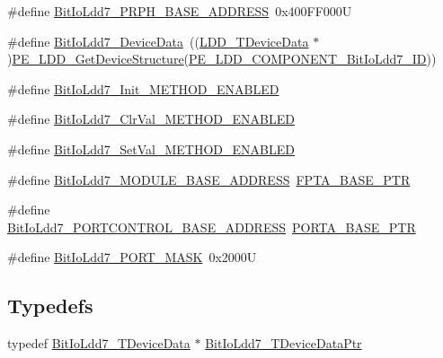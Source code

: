 \begin{DoxyCompactItemize}
\item 
\#define \hyperlink{group___bit_io_ldd7__module_gaecb0933dfdc4408d4e82af57b1458b41}{Bit\+Io\+Ldd7\+\_\+\+P\+R\+P\+H\+\_\+\+B\+A\+S\+E\+\_\+\+A\+D\+D\+R\+E\+SS}~0x400\+F\+F000U
\item 
\#define \hyperlink{group___bit_io_ldd7__module_ga28a1c938c911f765d2dc333694f9505f}{Bit\+Io\+Ldd7\+\_\+\+Device\+Data}~((\hyperlink{group___p_e___types__module_gac5cf1362f1f0e3a2ce71b1bf2276d091}{L\+D\+D\+\_\+\+T\+Device\+Data} $\ast$)\hyperlink{group___p_e___types__module_gaa1c23d559daef5bcd3327ca83fb56f5a}{P\+E\+\_\+\+L\+D\+D\+\_\+\+Get\+Device\+Structure}(\hyperlink{group___p_e___types__module_gaec9d06a6e78676f5d01ee4903a9960d3}{P\+E\+\_\+\+L\+D\+D\+\_\+\+C\+O\+M\+P\+O\+N\+E\+N\+T\+\_\+\+Bit\+Io\+Ldd7\+\_\+\+ID}))
\item 
\#define \hyperlink{group___bit_io_ldd7__module_ga0cd7de05139351a8d7223583734bc161}{Bit\+Io\+Ldd7\+\_\+\+Init\+\_\+\+M\+E\+T\+H\+O\+D\+\_\+\+E\+N\+A\+B\+L\+ED}
\item 
\#define \hyperlink{group___bit_io_ldd7__module_gaea56f115a6bef18bb9f57ff9d981ccbd}{Bit\+Io\+Ldd7\+\_\+\+Clr\+Val\+\_\+\+M\+E\+T\+H\+O\+D\+\_\+\+E\+N\+A\+B\+L\+ED}
\item 
\#define \hyperlink{group___bit_io_ldd7__module_gacb3f57b0defc7e929b43ddd858acfb15}{Bit\+Io\+Ldd7\+\_\+\+Set\+Val\+\_\+\+M\+E\+T\+H\+O\+D\+\_\+\+E\+N\+A\+B\+L\+ED}
\item 
\#define \hyperlink{group___bit_io_ldd7__module_gad8a699f629559c876160d573a75c2914}{Bit\+Io\+Ldd7\+\_\+\+M\+O\+D\+U\+L\+E\+\_\+\+B\+A\+S\+E\+\_\+\+A\+D\+D\+R\+E\+SS}~\hyperlink{group___backward___compatibility___symbols_ga4b0d89f517528ab7c1d2fdefe4c863d8}{F\+P\+T\+A\+\_\+\+B\+A\+S\+E\+\_\+\+P\+TR}
\item 
\#define \hyperlink{group___bit_io_ldd7__module_gac518d50a533da6d2db8b9027e57fc04f}{Bit\+Io\+Ldd7\+\_\+\+P\+O\+R\+T\+C\+O\+N\+T\+R\+O\+L\+\_\+\+B\+A\+S\+E\+\_\+\+A\+D\+D\+R\+E\+SS}~\hyperlink{group___p_o_r_t___peripheral_gaa18ec7594fe603225220ec6eda4a19ce}{P\+O\+R\+T\+A\+\_\+\+B\+A\+S\+E\+\_\+\+P\+TR}
\item 
\#define \hyperlink{group___bit_io_ldd7__module_gab9e4e814ee4d363a367ae7b2836543fc}{Bit\+Io\+Ldd7\+\_\+\+P\+O\+R\+T\+\_\+\+M\+A\+SK}~0x2000U
\end{DoxyCompactItemize}
\subsection*{Typedefs}
\begin{DoxyCompactItemize}
\item 
typedef \hyperlink{struct_bit_io_ldd7___t_device_data}{Bit\+Io\+Ldd7\+\_\+\+T\+Device\+Data} $\ast$ \hyperlink{group___bit_io_ldd7__module_ga42ed289439d061d65af4bf7a476285a8}{Bit\+Io\+Ldd7\+\_\+\+T\+Device\+Data\+Ptr}
\end{DoxyCompactItemize}
